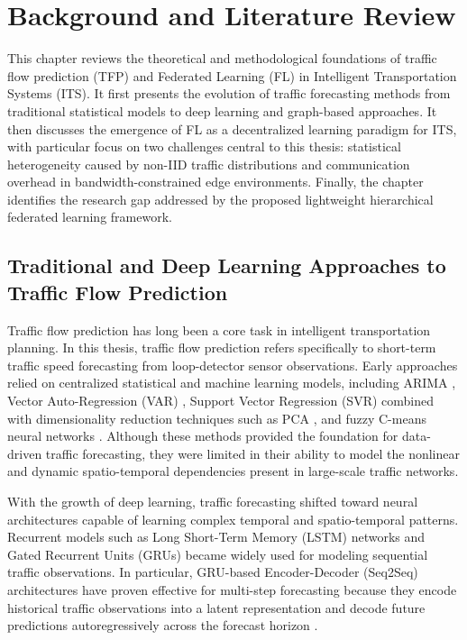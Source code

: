\chapter{Background and Literature Review}
\label{ch:background}

This chapter reviews the theoretical and methodological foundations of traffic flow prediction (TFP) and Federated Learning (FL) in Intelligent Transportation Systems (ITS). It first presents the evolution of traffic forecasting methods from traditional statistical models to deep learning and graph-based approaches. It then discusses the emergence of FL as a decentralized learning paradigm for ITS, with particular focus on two challenges central to this thesis: statistical heterogeneity caused by non-IID traffic distributions and communication overhead in bandwidth-constrained edge environments. Finally, the chapter identifies the research gap addressed by the proposed lightweight hierarchical federated learning framework.

\section{Traditional and Deep Learning Approaches to Traffic Flow Prediction}

Traffic flow prediction has long been a core task in intelligent transportation planning. In this thesis, traffic flow prediction refers specifically to short-term traffic speed forecasting from loop-detector sensor observations. Early approaches relied on centralized statistical and machine learning models, including ARIMA \cite{arima1970}, Vector Auto-Regression (VAR) \cite{var2005}, Support Vector Regression (SVR) combined with dimensionality reduction techniques such as PCA \cite{jin2008}, and fuzzy C-means neural networks \cite{tang2017}. Although these methods provided the foundation for data-driven traffic forecasting, they were limited in their ability to model the nonlinear and dynamic spatio-temporal dependencies present in large-scale traffic networks.

With the growth of deep learning, traffic forecasting shifted toward neural architectures capable of learning complex temporal and spatio-temporal patterns. Recurrent models such as Long Short-Term Memory (LSTM) networks \cite{hochreiter1997} and Gated Recurrent Units (GRUs) \cite{cho2014} became widely used for modeling sequential traffic observations. In particular, GRU-based Encoder-Decoder (Seq2Seq) architectures have proven effective for multi-step forecasting because they encode historical traffic observations into a latent representation and decode future predictions autoregressively across the forecast horizon \cite{zhu2025cmba}.

